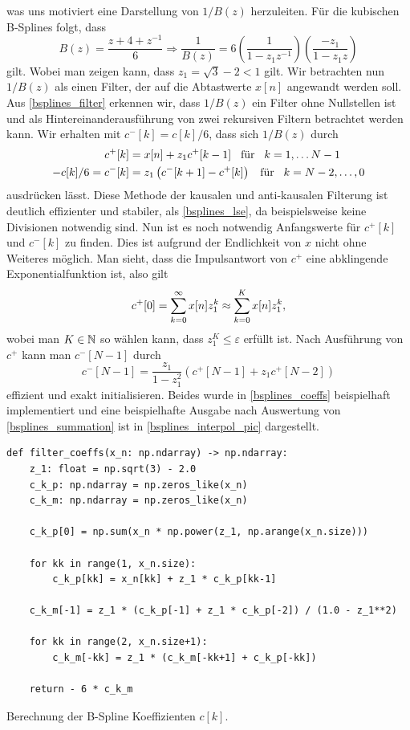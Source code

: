 was uns motiviert eine Darstellung von $1/B(z)$ herzuleiten. F\"ur die kubischen B-Splines folgt, dass
\begin{equation}\label{bsplines_filter}
    B(z) = \frac{z + 4 + z^{-1}}{6} 
    \Rightarrow \frac{1}{B(z)} 
        = 6 \left(\frac{1}{1 - z_1 z^{-1}}\right) \left(\frac{-z_1}{1 - z_1 z}\right)
\end{equation}
gilt. Wobei man zeigen kann, dass $z_1 = \sqrt{3} - 2 < 1$ gilt. Wir betrachten nun $1/B(z)$ als einen Filter, der auf die Abtastwerte $x[n]$ angewandt werden soll. Aus \eqref{bsplines_filter} erkennen wir, dass $1/B(z)$ ein Filter ohne Nullstellen ist und als Hintereinanderausf\"uhrung von zwei rekursiven Filtern betrachtet werden kann. Wir erhalten mit $c^{-}[k] = c[k]/6$, dass sich $1/B(z)$ durch
\begin{align}
    c^+[k] &= 
        x[n] + z_1 c^+[k-1] {\hspace{3mm} \text{f\"ur} \hspace{3mm}} k = 1, \dots N-1 \\
    -c[k]/6 = c^-[k] &= 
        z_1\left( c^{-}[k+1] - c^+[k]\right) {\hspace{3mm} \text{f\"ur} \hspace{3mm}} k = N-2, \dots, 0
\end{align}
ausdr\"ucken l\"asst. Diese Methode der kausalen und anti-kausalen Filterung ist deutlich effizienter und stabiler, als \eqref{bsplines_lse}, da beispielsweise keine Divisionen notwendig sind. Nun ist es noch notwendig Anfangswerte f\"ur $c^+[k]$ und $c^-[k]$ zu finden. Dies ist aufgrund der Endlichkeit von $x$ nicht ohne Weiteres m\"oglich. Man sieht, dass die Impulsantwort von $c^+$ eine abklingende Exponentialfunktion ist, also gilt
\begin{equation}
    c^+[0] = {\sum\limits_{k=0}^{\infty}{x[n] z_1^k}} \approx {\sum\limits_{k=0}^{K}{x[n] z_1^k}},
\end{equation}
wobei man $K \in \mathbb{N}$ so w\"ahlen kann, dass $z_1^K \leqslant \varepsilon$ erf\"ullt ist. Nach Ausf\"uhrung von $c^+$ kann man $c^-[N-1]$ durch
\begin{equation}
    c^-[N-1] = \frac{z_1}{1 - z_1^2}\left(c^+[N-1] + z_1 c^+[N-2]\right)
\end{equation}
effizient und exakt initialisieren. Beides wurde in \cref{bsplines_coeffs} beispielhaft implementiert und eine beispielhafte Ausgabe nach Auswertung von \eqref{bsplines_summation} ist in \cref{bsplines_interpol_pic} dargestellt.
%
\begin{listing}[t]
\begin{verbatim}
def filter_coeffs(x_n: np.ndarray) -> np.ndarray:
    z_1: float = np.sqrt(3) - 2.0
    c_k_p: np.ndarray = np.zeros_like(x_n)
    c_k_m: np.ndarray = np.zeros_like(x_n)
    
    c_k_p[0] = np.sum(x_n * np.power(z_1, np.arange(x_n.size)))
    
    for kk in range(1, x_n.size):
        c_k_p[kk] = x_n[kk] + z_1 * c_k_p[kk-1]
    
    c_k_m[-1] = z_1 * (c_k_p[-1] + z_1 * c_k_p[-2]) / (1.0 - z_1**2)

    for kk in range(2, x_n.size+1):
        c_k_m[-kk] = z_1 * (c_k_m[-kk+1] + c_k_p[-kk])
        
    return - 6 * c_k_m
\end{verbatim}
\caption{Berechnung der B-Spline Koeffizienten $c[k]$.}\label{bsplines_coeffs}            
\end{listing}
